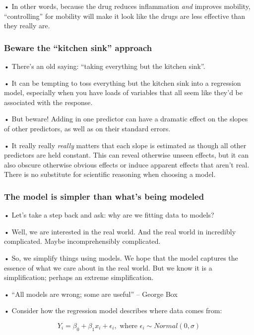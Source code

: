 \documentclass[
  letterpaper,
  DIV=11,
  numbers=noendperiod]{scrreprt}
\begin{document}
• In other words, because the drug reduces inflammation \emph{and}
improves mobility, ``controlling'' for mobility will make it look like
the drugs are less effective than they really are.

\hypertarget{beware-the-kitchen-sink-approach}{%
\subsubsection{Beware the ``kitchen sink''
approach}\label{beware-the-kitchen-sink-approach}}

• There's an old saying: ``taking everything but the kitchen sink''.

• It can be tempting to toss everything but the kitchen sink into a
regression model, especially when you have loads of variables that all
seem like they'd be associated with the response.

• But beware! Adding in one predictor can have a dramatic effect on the
slopes of other predictors, as well as on their standard errors.

• It really really \emph{really} matters that each slope is estimated as
though all other predictors are held constant. This can reveal otherwise
unseen effects, but it can also obscure otherwise obvious effects or
induce apparent effects that aren't real. There is no substitute for
scientific reasoning when choosing a model.

\hypertarget{the-model-is-simpler-than-whats-being-modeled}{%
\subsubsection{The model is simpler than what's being
modeled}\label{the-model-is-simpler-than-whats-being-modeled}}

• Let's take a step back and ask: why are we fitting data to models?

• Well, we are interested in the real world. And the real world in
incredibly complicated. Maybe incomprehensibly complicated.

• So, we simplify things using models. We hope that the model captures
the essence of what we care about in the real world. But we know it is a
simplification; perhaps an extreme simplification.

• ``All models are wrong; some are useful'' -- George Box

• Consider how the regression model describes where data comes from:

\[
Y_i = \beta_0 + \beta_1x_{i} + \epsilon_i, \text{ where } \epsilon_i \sim Normal(0,\sigma)
\]
\end{document}
